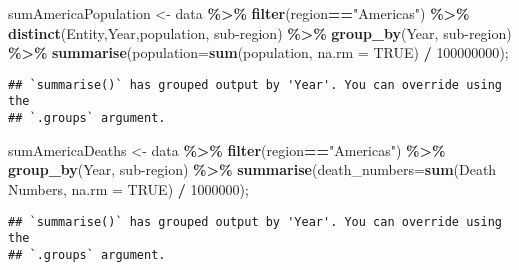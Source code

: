 \documentclass[
]{article}
\newenvironment{Shaded}{\begin{snugshade}}{\end{snugshade}}
\newcommand{\AttributeTok}[1]{\textcolor[rgb]{0.13,0.29,0.53}{#1}}
\newcommand{\ConstantTok}[1]{\textcolor[rgb]{0.56,0.35,0.01}{#1}}
\newcommand{\DecValTok}[1]{\textcolor[rgb]{0.00,0.00,0.81}{#1}}
\newcommand{\FunctionTok}[1]{\textcolor[rgb]{0.13,0.29,0.53}{\textbf{#1}}}
\newcommand{\NormalTok}[1]{#1}
\newcommand{\OtherTok}[1]{\textcolor[rgb]{0.56,0.35,0.01}{#1}}
\newcommand{\SpecialCharTok}[1]{\textcolor[rgb]{0.81,0.36,0.00}{\textbf{#1}}}
\newcommand{\StringTok}[1]{\textcolor[rgb]{0.31,0.60,0.02}{#1}}
\begin{document}
\begin{Shaded}
\begin{Highlighting}[]
\NormalTok{sumAmericaPopulation }\OtherTok{\textless{}{-}}\NormalTok{ data }\SpecialCharTok{\%\textgreater{}\%} 
  \FunctionTok{filter}\NormalTok{(region}\SpecialCharTok{==}\StringTok{"Americas"}\NormalTok{) }\SpecialCharTok{\%\textgreater{}\%}
  \FunctionTok{distinct}\NormalTok{(Entity,Year,population, }\StringTok{\textasciigrave{}}\AttributeTok{sub{-}region}\StringTok{\textasciigrave{}}\NormalTok{) }\SpecialCharTok{\%\textgreater{}\%}
  \FunctionTok{group\_by}\NormalTok{(Year, }\StringTok{\textasciigrave{}}\AttributeTok{sub{-}region}\StringTok{\textasciigrave{}}\NormalTok{) }\SpecialCharTok{\%\textgreater{}\%}
  \FunctionTok{summarise}\NormalTok{(}\AttributeTok{population=}\FunctionTok{sum}\NormalTok{(population, }\AttributeTok{na.rm =} \ConstantTok{TRUE}\NormalTok{) }\SpecialCharTok{/} \DecValTok{100000000}\NormalTok{);}
\end{Highlighting}
\end{Shaded}

\begin{verbatim}
## `summarise()` has grouped output by 'Year'. You can override using the
## `.groups` argument.
\end{verbatim}

\begin{Shaded}
\begin{Highlighting}[]
\NormalTok{sumAmericaDeaths }\OtherTok{\textless{}{-}}\NormalTok{ data }\SpecialCharTok{\%\textgreater{}\%}
  \FunctionTok{filter}\NormalTok{(region}\SpecialCharTok{==}\StringTok{"Americas"}\NormalTok{) }\SpecialCharTok{\%\textgreater{}\%} 
  \FunctionTok{group\_by}\NormalTok{(Year, }\StringTok{\textasciigrave{}}\AttributeTok{sub{-}region}\StringTok{\textasciigrave{}}\NormalTok{) }\SpecialCharTok{\%\textgreater{}\%}
  \FunctionTok{summarise}\NormalTok{(}\AttributeTok{death\_numbers=}\FunctionTok{sum}\NormalTok{(}\StringTok{\textasciigrave{}}\AttributeTok{Death Numbers}\StringTok{\textasciigrave{}}\NormalTok{, }\AttributeTok{na.rm =} \ConstantTok{TRUE}\NormalTok{) }\SpecialCharTok{/} \DecValTok{1000000}\NormalTok{);}
\end{Highlighting}
\end{Shaded}

\begin{verbatim}
## `summarise()` has grouped output by 'Year'. You can override using the
## `.groups` argument.
\end{verbatim}
\end{document}
